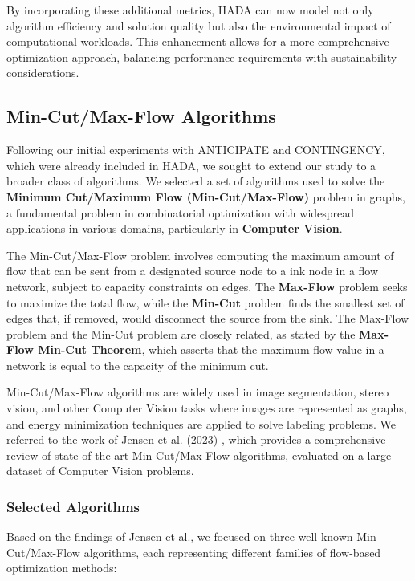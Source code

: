 \documentclass[a4paper,singleside,12pt]{report} %
\begin{document}
By incorporating these additional metrics, HADA can now model not only algorithm efficiency and solution quality but also the 
environmental impact of computational workloads. This enhancement allows for a more comprehensive optimization approach, balancing 
performance requirements with sustainability considerations.

\subsection{Min-Cut/Max-Flow Algorithms}

Following our initial experiments with ANTICIPATE and CONTINGENCY, which were already included in HADA, we sought to extend our 
study to a broader class of algorithms. We selected a set of algorithms used to solve the \textbf{Minimum Cut/Maximum Flow 
(Min-Cut/Max-Flow)} problem in graphs, a fundamental problem in combinatorial optimization with widespread applications in various 
domains, particularly in \textbf{Computer Vision}. 

The Min-Cut/Max-Flow problem involves computing the maximum amount of flow that can be sent from a designated source node to a 
ink node in a flow network, subject to capacity constraints on edges. The \textbf{Max-Flow} problem seeks to maximize the total 
flow, while the \textbf{Min-Cut} problem finds the smallest set of edges that, if removed, would disconnect the source from the sink. 
The Max-Flow problem and the Min-Cut problem are closely related, as stated by the \textbf{Max-Flow Min-Cut Theorem}, which asserts 
that the maximum flow value in a network is equal to the capacity of the minimum cut.

Min-Cut/Max-Flow algorithms are widely used in image segmentation, stereo vision, and other Computer Vision tasks where images are 
represented as graphs, and energy minimization techniques are applied to solve labeling problems. We referred to the work of Jensen 
et al. (2023) \cite{Jensen2023Maxflow}, which provides a comprehensive review of state-of-the-art Min-Cut/Max-Flow algorithms, 
evaluated on a large dataset of Computer Vision problems. 

\subsubsection{Selected Algorithms}

Based on the findings of Jensen et al., we focused on three well-known Min-Cut/Max-Flow algorithms, each representing different 
families of flow-based optimization methods:
\end{document}

